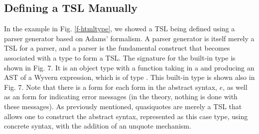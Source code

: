 %

\subsection{Defining a TSL Manually}

In the example in Fig. \ref{f-htmltype}, we showed a TSL being defined using a parser generator based on Adams' formalism. A parser generator is itself merely a TSL for a parser, and a parser is the fundamental construct that becomes associated with a type to form a TSL. The signature for the built-in type  is shown in Fig. 7. It is an object type with a  function taking in a  and producing an AST of a Wyvern expression, which is of type . This built-in type is shown also in Fig. 7. Note that there is a form for each form in the abstract syntax, $e$, as well as an  form for indicating error messages (in the theory, nothing is done with these messages). As previously mentioned, quasiquotes are merely a TSL that allows one to construct the abstract syntax, represented as this case type, using concrete syntax, with the addition of an unquote mechanism.

